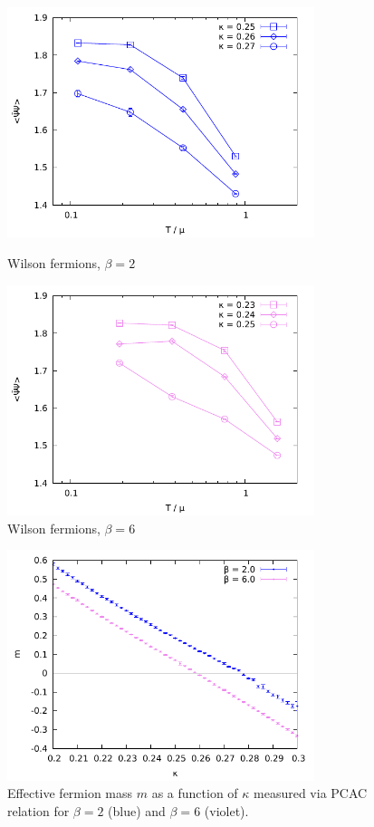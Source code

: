\documentclass[12pt,a4paper]{article}
\begin{document}
\begin{figure}[ht]
  \centering
  \includegraphics[width=0.8\textwidth]{Wilson/pbp-b02-mu}
  \caption{Wilson fermions, $\beta = 2$}
  \label{fig:wilson-beta2}
  \vspace{1.5cm}
  \includegraphics[width=0.8\textwidth]{Wilson/pbp-b06-mu}
  \caption{Wilson fermions, $\beta = 6$}
  \label{fig:wilson-beta6}
\end{figure}

\begin{figure}[t]
  \centering
  \includegraphics[width=0.8\textwidth]{Wilson/fig-PCAC-Wilson.pdf}
  \caption{Effective fermion mass $m$ as a function of $\kappa$ measured via PCAC relation for $\beta = 2$ (blue) and $\beta = 6$ (violet).}
  \label{fig:PCAC-wilson}
\end{figure}
\end{document}

